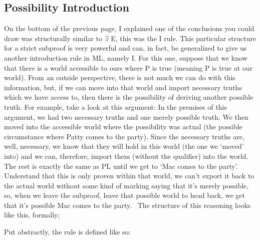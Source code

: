 \subsection{Possibility Introduction}
On the bottom of the previous page, I explained one of the conclusions you could draw was structurally similar to $\exists$ E, this was the \ebox I rule. This particular structure for a strict subproof is very powerful and can, in fact, be generalized to give us another introduction rule in ML, namely \ediamond I. For this one, suppose that we know that there is a world accessible to ours where P is true (meaning \ediamond P is true at our world). From an outside perspective, there is not much we can do with this information, but, if we can move into that world and import necessary truths which we have access to, then there is the possibility of deriving another possible truth. For example, take a look at this argument:
In the premises of this argument, we had two necessary truths and one merely possible truth. We then moved into the accessible world where the possibility was actual (the possible circumstance where Patty comes to the party). Since the necessary truths are, well, necessary, we know that they will hold in this world (the one we `moved' into) and we can, therefore, import them (without the qualifier) into the world. The rest is exactly the same as PL until we get to `Mac comes to the party'. Understand that this is only proven within that world, we can't export it back to the actual world without some kind of marking saying that it's merely possible, so, when we leave the subproof, leave that possible world to head back, we get that it's possible Mac comes to the party.  The structure of this reasoning looks like this, formally;
\begin{fitchproof}
\open
{}
	
\close
{}
\end{fitchproof}
Put abstractly, the rule is defined like so:


